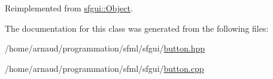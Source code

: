 Reimplemented from \hyperlink{classsfgui_1_1Object_d2750b3d51a3a208739ed6c0c57df6aa}{sfgui::Object}.

The documentation for this class was generated from the following files:\begin{CompactItemize}
\item 
/home/arnaud/programmation/sfml/sfgui/\hyperlink{button_8hpp}{button.hpp}\item 
/home/arnaud/programmation/sfml/sfgui/\hyperlink{button_8cpp}{button.cpp}\end{CompactItemize}
